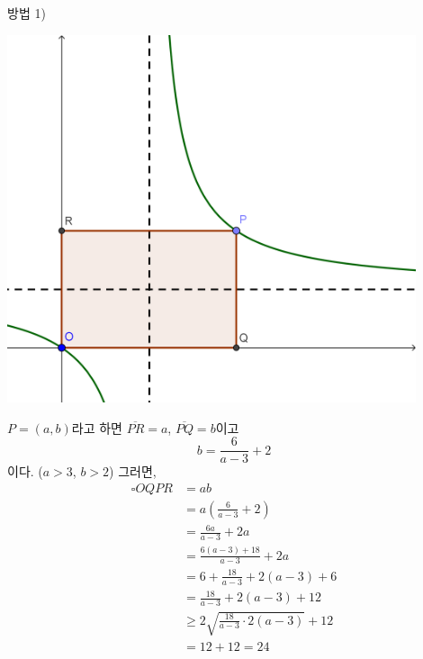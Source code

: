 \documentclass[a4paper]{oblivoir}
\begin{document}
%
\begin{minipage}{0.45\textwidth}
방법 1)
\begin{center}
\includegraphics[width=0.9\textwidth]{1}
\end{center}

\(P=(a,b)\)라고 하면 \(\overline{PR}=a\), \(\overline{PQ}=b\)이고
\[b=\frac6{a-3}+2\]
이다.
(\(a>3\), \(b>2\))
그러면,
\begin{align*}
\square OQPR
&=ab\\
&=a\left(\frac6{a-3}+2\right)\\
&=\frac{6a}{a-3}+2a\\
&=\frac{6(a-3)+18}{a-3}+2a\\
&=6+\frac{18}{a-3}+2(a-3)+6\\
&=\frac{18}{a-3}+2(a-3)+12\\
&\ge2\sqrt{\frac{18}{a-3}\cdot2(a-3)}+12\\
&=12+12=24
\end{align*}
\end{minipage}
~
\end{document}
